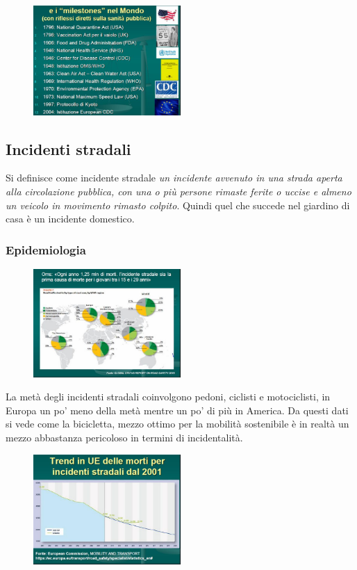 \begin{figure}[!ht]
\centering
	\includegraphics[width=0.5\textwidth]{28/image3.jpg}
	\end{figure}
	
\subsection{Incidenti stradali}

Si definisce come incidente stradale \emph{un incidente avvenuto in una
strada aperta alla circolazione pubblica, con una o più persone rimaste
ferite o uccise e almeno un veicolo in movimento rimasto colpito}.
Quindi quel che succede nel giardino di casa è un incidente domestico.

\subsubsection{Epidemiologia}

\begin{figure}[!ht]
\centering
	\includegraphics[width=0.5\textwidth]{28/image4.jpg}
	\end{figure}
	
La metà degli incidenti stradali coinvolgono pedoni, ciclisti e
motociclisti, in Europa un po' meno della metà mentre un po' di più in
America. Da questi dati si vede come la bicicletta, mezzo ottimo per la
mobilità sostenibile è in realtà un mezzo abbastanza pericoloso in
termini di incidentalità.

\begin{figure}[!ht]
\centering
	\includegraphics[width=0.5\textwidth]{28/image5.jpg}
	\end{figure}

